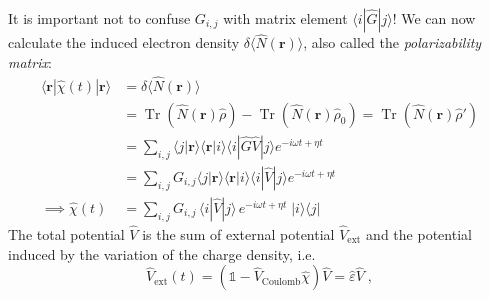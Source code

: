 \documentclass[a4paper,12pt]{article}
\begin{document}
    It is important not to confuse $G_{i,j}$ with matrix element $\langle i|\hat G| j\rangle$! We can now calculate the induced electron density $\delta \langle\hat N(\mathbf{r})\rangle$, also called the \textit{polarizability matrix}:
    \begin{equation} \label{eq:def_chi_function}
    \begin{aligned}
        \langle \mathbf{r} | \hat\chi(t) | \mathbf{r} \rangle
            &= \delta\langle \hat N(\mathbf{r})\rangle \\
            &= \operatorname{Tr}(\hat N(\mathbf{r}) \hat\rho) - \operatorname{Tr}(\hat N(\mathbf{r}) \hat\rho_0) = \operatorname{Tr}(\hat N(\mathbf{r})\hat\rho') \\
            &= \sum_{i,j} \langle j|\mathbf{r}\rangle \langle\mathbf{r}| i\rangle \langle i| \hat G \hat V | j \rangle e^{-i\omega t + \eta t} \\
            &= \sum_{i,j} G_{i,j} \langle j|\mathbf{r}\rangle \langle\mathbf{r}| i\rangle \langle i| \hat V | j \rangle e^{-i\omega t + \eta t} \\
        \implies \hat \chi(t) &= \sum_{i,j} G_{i,j}\, \langle i| \hat V|j\rangle \, e^{-i\omega t + \eta t}\; | i \rangle\!\langle j |
    \end{aligned}
    \end{equation}
    The total potential $\hat V$ is the sum of external potential $\hat V_\text{ext}$ and the potential induced by the variation of the charge density, i.e.
    \begin{equation} \label{eq:def_dielectric_function}
        \hat V_\text{ext}(t) 
            = \left( \mathds{1} - \hat V_\text{Coulomb}\hat\chi \right) \hat V
            = \hat \varepsilon \hat V \;,
    \end{equation}
\end{document}
